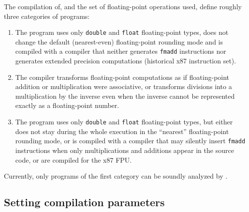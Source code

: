 \documentclass{frama-c-book}
\begin{document}

The compilation of, and the set of floating-point operations used, define
roughly three categories of programs:
\begin{enumerate}

\item The program uses only
\lstinline|double| and \lstinline|float| floating-point types,
does not change the default (nearest-even) floating-point rounding
mode and is compiled with a compiler that neither generates
\lstinline|fmadd| instructions nor generates extended precision computations
(historical x87 instruction set).

\item The compiler transforms floating-point computations
as if floating-point addition or multiplication were associative,
or transforms divisions into a multiplication by the inverse even when
the inverse cannot be represented exactly as a floating-point number.

\item The program uses only
\lstinline|double| and \lstinline|float| floating-point types,
but either does not stay during the whole
execution in the ``nearest'' floating-point rounding mode, or is
compiled with a compiler that may silently insert \lstinline|fmadd|
instructions when only multiplications and additions appear in the
source code, or are compiled for the x87 FPU. %
\end{enumerate}
%
Currently, only programs of the first category can be soundly analyzed by
\Eva{}.


\subsection{Setting compilation parameters} \label{compilation}
\end{document}
